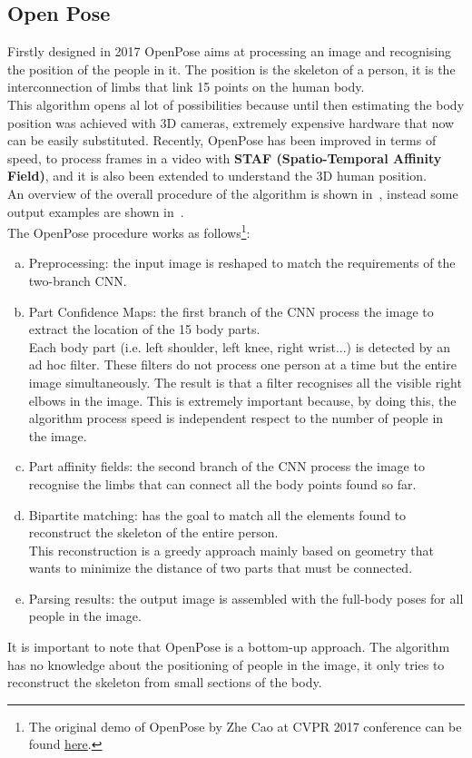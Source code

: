 \subsection{Open Pose} \label{sec:openpose}
Firstly designed in 2017 OpenPose\cite{openpose-PAF} aims at processing an image and recognising the position of the people in it. The position is the skeleton of a person, it is the interconnection of limbs that link 15 points on the human body.\\
This algorithm opens al lot of possibilities because until then estimating the body position was achieved with 3D cameras, extremely expensive hardware that now can be easily substituted. Recently, OpenPose has been improved in terms of speed, to process frames in a video with \textbf{STAF (Spatio-Temporal Affinity Field)}\cite{openpose-STAF}, and it is also been extended to understand the 3D human position.\\
An overview of the overall procedure of the algorithm is shown in~, instead some output examples are shown in~.\\
The OpenPose procedure works as follows\footnote{The original demo of OpenPose by Zhe Cao at CVPR 2017 conference can be found \href{https://www.youtube.com/watch?v=pW6nZXeWlGM}{here}.}:
\begin{enumerate}[a)]
	\item Preprocessing: the input image is reshaped to match the requirements of the two-branch CNN.
	\item Part Confidence Maps: the first branch of the CNN process the image to extract the location of the 15 body parts.\\
	Each body part (i.e. left shoulder, left knee, right wrist...) is detected by an ad hoc filter. These filters do not process one person at a time but the entire image simultaneously. The result is that a filter recognises all the visible right elbows in the image. This is extremely important because, by doing this, the algorithm process speed is independent respect to the number of people in the image.
	\item Part affinity fields: the second branch of the CNN process the image to recognise the limbs that can connect all the body points found so far.
	\item Bipartite matching: has the goal to match all the elements found to reconstruct the skeleton of the entire person.\\
	This reconstruction is a greedy approach mainly based on geometry that wants to minimize the distance of two parts that must be connected.
	\item Parsing results: the output image is assembled with the full-body poses for all people in the image.
\end{enumerate}
It is important to note that OpenPose is a bottom-up approach. The algorithm has no knowledge about the positioning of people in the image, it only tries to reconstruct the skeleton from small sections of the body.

